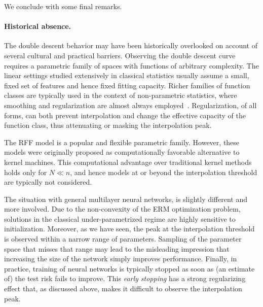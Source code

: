 \documentclass[11pt]{article}
\begin{document}
We conclude with some final remarks.
\paragraph{Historical absence.}
The double descent behavior may have been historically overlooked on account of several cultural and practical barriers.
Observing the double descent curve requires a parametric family of spaces with functions of arbitrary complexity.
The linear settings studied extensively in classical statistics usually assume a small, fixed set of features and hence fixed fitting capacity. 
Richer families of function classes are typically used in the context of non-parametric statistics, where smoothing and regularization are almost always employed~\cite{wasserman2006all}.
Regularization, of all forms, can both prevent interpolation and change the effective capacity of the function class, thus attenuating or masking the interpolation peak.

The RFF model is a  popular and flexible parametric family.
However, these models were originally proposed as computationally favorable alternative to kernel machines.
This computational advantage over traditional kernel methods holds only for $N \ll n$, and hence models at or beyond the interpolation threshold are typically not considered.

The situation with general multilayer neural networks, is slightly different and more involved.
Due to the non-convexity of the ERM optimization problem, solutions in the classical under-parametrized regime are highly sensitive to initialization.
Moreover, as we have seen, the peak at the interpolation threshold is observed within a narrow range of parameters. Sampling of the parameter space that misses that range may lead to the misleading impression that increasing the size of the network simply improves performance.
Finally, in practice, training of neural networks is typically stopped as soon as (an estimate of) the test risk fails to improve. This {\em early stopping} has a strong regularizing effect that, as discussed above, makes it difficult to observe the interpolation peak. 
\end{document}
